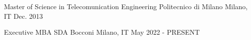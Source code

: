 
\begin{cventries}
  \cventrynodata
    {Master of Science in Telecomunication Engineering} %
    {Politecnico di Milano} %
    {Milano, IT} %
    {Dec. 2013} %
    {}

	\cventrynodata
	{Executive MBA} %
	{SDA Bocconi} %
	{Milano, IT} %
	{May 2022 - PRESENT} %
	{}
\end{cventries}
